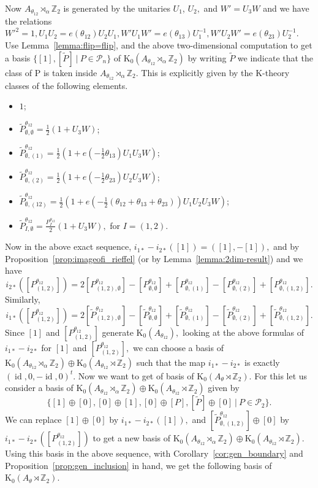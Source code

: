 \documentclass[9pt, BCOR=2mm]{amsart}
\numberwithin{equation}{section}
\numberwithin{equation}{section}
\newcommand{\Z}{{\mathbb{Z}}}
\newcommand{\K}{\mathrm{K}} %
\DeclareMathOperator{\id}{id}
\begin{document}
 
Now $A_{\theta_{12}}\rtimes_\alpha \Z_2$ is generated by the unitaries $U_1$, $U_2,$ and $W'=U_3W$ and we have the relations $W'^2 = 1, U_1 U_2 = e(\theta_{12}) U_2 U_1, W'U_1W' = e(\theta_{13})U_1^{-1}, W'U_2W' = e(\theta_{23})U_2^{-1}.$ Use Lemma~\ref{lemma:flip=flip}, and the above two-dimensional computation to get a basis $\{[1], [\tilde P] ~|~ P\in \mathcal{P}_n\}$ of $\K_0(A_{\theta_{12}}\rtimes_\alpha \Z_2)$  by writing $\tilde P$ we indicate that the class of P is taken inside $A_{\theta_{12}}\rtimes_\alpha \Z_2.$  This is explicitly given by the K-theory classes of the following elements. 
 \begin{itemize}
 	
\item $1$;
\item  $\tilde P^{\theta_{12}}_{\emptyset,\emptyset}= \frac{1}{2} (1+U_3W)$;
 \item $\tilde P^{\theta_{12}}_{\emptyset,(1)}= \frac{1}{2} (1+e(-\frac{1}{2}\theta_{13})U_1U_3W)$;
 \item $\tilde P^{\theta_{12}}_{\emptyset,(2)}= \frac{1}{2} (1+e(-\frac{1}{2}\theta_{23})U_2U_3W)$;
 \item $\tilde P^{\theta_{12}}_{\emptyset,(12)}= \frac{1}{2} (1+e( -\frac{1}{2} ({\theta_{12}}+\theta_{13}+\theta_{23}))U_1U_2U_3W)$;
 \item $\tilde P^{\theta_{12}}_{I,\emptyset}=\frac{P^{\theta_{12}}_{I}}{2}(1+U_3W),$ for $I=(1,2).$ 
  \end{itemize}
 Now in the above exact sequence, $i_{1*}-i_{2*}([1])=([1],-[1]),$ and by Proposition~\ref{prop:imageofi_rieffel} (or by Lemma~\ref{lemma:2dim-result}) and we have 
$$i_{2*}([P_{(1,2)}^{\theta_{12}}])=	2[P_{(1,2),\emptyset} ^{\theta_{12}}]-[P_{\emptyset,\emptyset} ^{\theta_{12}}]+[P_{\emptyset,(1)} ^{\theta_{12}}]-[P_{\emptyset, (2)} ^{\theta_{12}}]+[P_{\emptyset, (1,2)} ^{\theta_{12}}].$$
Similarly,
$$i_{1*}([P_{(1,2)}^{\theta_{12}}])=	2[\tilde P_{(1,2),\emptyset} ^{\theta_{12}}]-[\tilde P_{\emptyset,\emptyset} ^{\theta_{12}}]+[\tilde P_{\emptyset,(1)} ^{\theta_{12}}]-[\tilde P_{\emptyset, (2)} ^{\theta_{12}}]+[\tilde P_{\emptyset, (1,2)} ^{\theta_{12}}].$$ 
Since $[1]$ and $[P_{(1,2)}^{\theta_{12}}]$ generate $\K_0(A_{\theta_{12}}),$ 
 looking at the above formulas of $i_{1*}-i_{2*}$ for $[1]$ and $[P_{(1,2)}^{\theta_{12}}],$ we can choose a basis of $\K_0 (A_{\theta_{12}}\rtimes_\alpha  \Z_2)\oplus \K_0 (A_{\theta_{12}}\rtimes \Z_2)$ such that the map $i_{1*}-i_{2*}$ is exactly  $(\id, 0,-\id, 0)^t.$ 
 Now we want to get of basis of $\K_0(A_{\theta}\rtimes \Z_2).$ For this let us consider a basis of $\K_0 (A_{\theta_{12}}\rtimes_\alpha  \Z_2)\oplus \K_0 (A_{\theta_{12}}\rtimes \Z_2)$ given by  $$\{[1]\oplus [0], [0]\oplus [1], [0]\oplus [P],[\tilde P]\oplus [0] ~|~ P\in \mathcal{P}_2\}.$$ We can replace $[1]\oplus [0]$ by $i_{1*}-i_{2*}([1]),$ and $[\tilde P_{\emptyset, (1,2)} ^{\theta_{12}}]\oplus [0]$ by  $i_{1*}-i_{2*}([P_{(1,2)}^{\theta_{12}}])$ to get a new basis of $\K_0 (A_{\theta_{12}}\rtimes_\alpha  \Z_2)\oplus \K_0 (A_{\theta_{12}}\rtimes \Z_2).$ Using this basis in the above sequence, with Corollary~\ref{cor:gen_boundary} and Proposition~\ref{prop:gen_inclusion} in hand, we get the following basis of 
 $\K_0(A_{\theta}\rtimes \Z_2).$   
 
\end{document}
